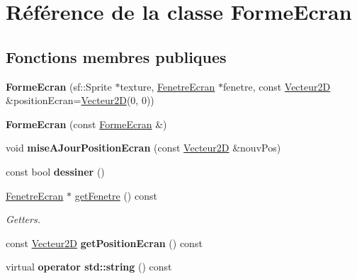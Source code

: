 \hypertarget{class_forme_ecran}{}\section{Référence de la classe Forme\+Ecran}
\label{class_forme_ecran}
\subsection*{Fonctions membres publiques}
\begin{DoxyCompactItemize}
\item 
\mbox{\label{class_forme_ecran_a8b4ddb88988108565c157d0db2ea3936}} 
{\bfseries Forme\+Ecran} (sf\+::\+Sprite $\ast$texture, \mbox{\hyperlink{class_fenetre_ecran}{Fenetre\+Ecran}} $\ast$fenetre, const \mbox{\hyperlink{class_vecteur2_d}{Vecteur2D}} \&position\+Ecran=\mbox{\hyperlink{class_vecteur2_d}{Vecteur2D}}(0, 0))
\item 
\mbox{\label{class_forme_ecran_a389a4eef0f47f3451440113055453052}} 
{\bfseries Forme\+Ecran} (const \mbox{\hyperlink{class_forme_ecran}{Forme\+Ecran}} \&)
\item 
\mbox{\label{class_forme_ecran_af7218febcf2ff9b7881fff962a81d5e9}} 
void {\bfseries mise\+A\+Jour\+Position\+Ecran} (const \mbox{\hyperlink{class_vecteur2_d}{Vecteur2D}} \&nouv\+Pos)
\item 
\mbox{\label{class_forme_ecran_aad18791a0647fbad303b35fb893a21ff}} 
const bool {\bfseries dessiner} ()
\item 
\mbox{\label{class_forme_ecran_a781177121ce901c848958800e0ce12ec}} 
\mbox{\hyperlink{class_fenetre_ecran}{Fenetre\+Ecran}} $\ast$ \mbox{\hyperlink{class_forme_ecran_a781177121ce901c848958800e0ce12ec}{get\+Fenetre}} () const
\begin{DoxyCompactList}\small\item\em Getters. \end{DoxyCompactList}\item 
\mbox{\label{class_forme_ecran_a6bf6d1c849fed205f2fc7f1a822ee383}} 
const \mbox{\hyperlink{class_vecteur2_d}{Vecteur2D}} {\bfseries get\+Position\+Ecran} () const
\item 
\mbox{\label{class_forme_ecran_a0dc759bf4cdbe9a2e679566263284128}} 
virtual {\bfseries operator std\+::string} () const
\end{DoxyCompactItemize}

